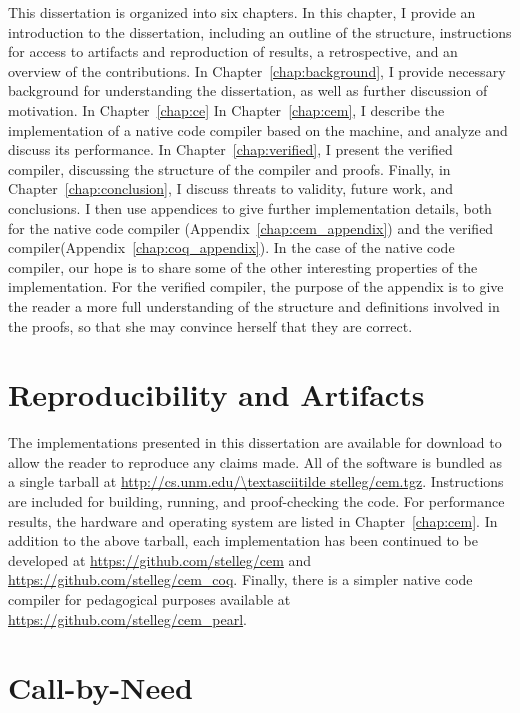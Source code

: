 This dissertation is organized into six chapters. In this chapter, I provide
an introduction to the dissertation, including an outline of the structure,
instructions for access to artifacts and reproduction of results, a
retrospective, and an overview of the contributions. In
Chapter~\ref{chap:background}, I provide necessary background for understanding
the dissertation, as well as further discussion of motivation. In
Chapter~\ref{chap:ce}  In Chapter~\ref{chap:cem}, I describe the implementation
of a native code compiler based on the \ce machine, and analyze and discuss its
performance. In Chapter~\ref{chap:verified}, I present the verified compiler,
discussing the structure of the compiler and proofs. Finally, in
Chapter~\ref{chap:conclusion}, I discuss threats to validity, future work, and
conclusions. I then use appendices to give further implementation details, both
for the native code compiler (Appendix~\ref{chap:cem_appendix}) and the verified
compiler(Appendix~\ref{chap:coq_appendix}). In the case of the native code
compiler, our hope is to share some of the other interesting properties of the
implementation.  For the verified compiler, the purpose of the appendix is to
give the reader a more full understanding of the structure and definitions
involved in the proofs, so that she may convince herself that they are
correct.

\section{Reproducibility and Artifacts}

The implementations presented in this dissertation are available for download to
allow the reader to reproduce any claims made. All of the software is bundled as
a single tarball at \url{http://cs.unm.edu/\textasciitilde stelleg/cem.tgz}.
Instructions are included for building, running, and proof-checking the code.
For performance results, the hardware and operating system are listed in
Chapter~\ref{chap:cem}. In addition to the above tarball, each implementation has been
continued to be developed at \url{https://github.com/stelleg/cem} and
\url{https://github.com/stelleg/cem\_coq}. Finally, there is a simpler native
code compiler for pedagogical purposes available at
\url{https://github.com/stelleg/cem\_pearl}. 

\section{Call-by-Need}


